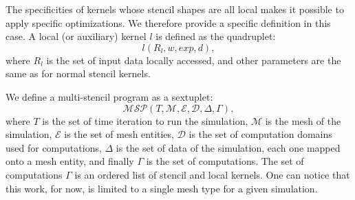 The specificities of kernels whose stencil shapes are all local makes it possible to apply specific optimizations.
We therefore provide a specific definition in this case.
A local (or auxiliary) kernel $l$ is defined as the quadruplet:
\begin{equation} 
l(R_l,w,exp,d),
\label{eq:loc}
\end{equation}
where $R_l$ is the set of input data locally accessed, and other parameters are the same as for normal stencil kernels.

We define a multi-stencil program as a sextuplet:
\begin{equation} 
\mathcal{MSP}(T,\mathcal{M},\mathcal{E},\mathcal{D},\Delta,\Gamma),
\label{eq:msp}
\end{equation}
where $T$ is the set of time iteration to run the simulation, $\mathcal{M}$ is the mesh of the simulation, $\mathcal{E}$ is the set of mesh entities, $\mathcal{D}$ is the set of computation domains used for computations, $\Delta$ is the set of data of the simulation, each one mapped onto a mesh entity, and finally $\Gamma$ is the set of computations. The set of computations $\Gamma$ is an ordered list of stencil and local kernels.
One can notice that this work, for now, is limited to a single mesh type for a given simulation.



